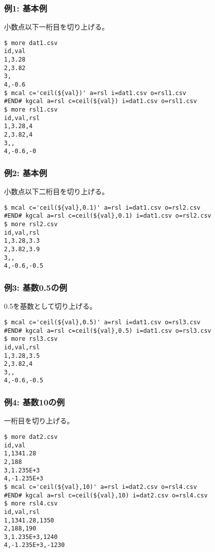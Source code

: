 \subsubsection*{例1: 基本例}

小数点以下一桁目を切り上げる。


\begin{Verbatim}[baselinestretch=0.7,frame=single]
$ more dat1.csv
id,val
1,3.28
2,3.82
3,
4,-0.6
$ mcal c='ceil(${val})' a=rsl i=dat1.csv o=rsl1.csv
#END# kgcal a=rsl c=ceil(${val}) i=dat1.csv o=rsl1.csv
$ more rsl1.csv
id,val,rsl
1,3.28,4
2,3.82,4
3,,
4,-0.6,-0
\end{Verbatim}
\subsubsection*{例2: 基本例}

小数点以下二桁目を切り上げる。


\begin{Verbatim}[baselinestretch=0.7,frame=single]
$ mcal c='ceil(${val},0.1)' a=rsl i=dat1.csv o=rsl2.csv
#END# kgcal a=rsl c=ceil(${val},0.1) i=dat1.csv o=rsl2.csv
$ more rsl2.csv
id,val,rsl
1,3.28,3.3
2,3.82,3.9
3,,
4,-0.6,-0.5
\end{Verbatim}
\subsubsection*{例3: 基数0.5の例}

0.5を基数として切り上げる。


\begin{Verbatim}[baselinestretch=0.7,frame=single]
$ mcal c='ceil(${val},0.5)' a=rsl i=dat1.csv o=rsl3.csv
#END# kgcal a=rsl c=ceil(${val},0.5) i=dat1.csv o=rsl3.csv
$ more rsl3.csv
id,val,rsl
1,3.28,3.5
2,3.82,4
3,,
4,-0.6,-0.5
\end{Verbatim}
\subsubsection*{例4: 基数10の例}

一桁目を切り上げる。


\begin{Verbatim}[baselinestretch=0.7,frame=single]
$ more dat2.csv
id,val
1,1341.28
2,188
3,1.235E+3
4,-1.235E+3
$ mcal c='ceil(${val},10)' a=rsl i=dat2.csv o=rsl4.csv
#END# kgcal a=rsl c=ceil(${val},10) i=dat2.csv o=rsl4.csv
$ more rsl4.csv
id,val,rsl
1,1341.28,1350
2,188,190
3,1.235E+3,1240
4,-1.235E+3,-1230
\end{Verbatim}
